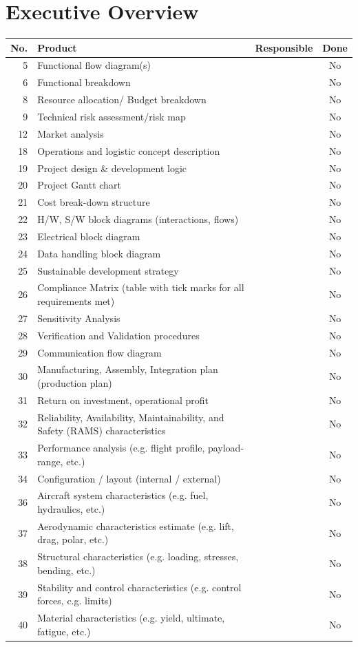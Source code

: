 \chapter{Executive Overview} \label{ch:executvesum}


\begin{tabularx}{\textwidth}{r X l c}
\toprule
\textbf{No.} & \textbf{Product} & \textbf{Responsible} & \textbf{Done} \\
\midrule
5 & Functional flow diagram(s) & & No \\
6 & Functional breakdown & & No \\
8 & Resource allocation/ Budget breakdown & & No \\
9 & Technical risk assessment/risk map & & No \\
12 & Market analysis & & No \\
18 & Operations and logistic concept description & & No \\
19 & Project design \& development logic & & No \\
20 & Project Gantt chart & & No \\
21 & Cost break-down structure & & No \\
22 & H/W, S/W block diagrams (interactions, flows) & & No \\
23 & Electrical block diagram & & No \\
24 & Data handling block diagram & & No \\
25 & Sustainable development strategy & & No \\
26 & Compliance Matrix (table with tick marks for all requirements met) & & No \\
27 & Sensitivity Analysis & & No \\
28 & Verification and Validation procedures & & No \\
29 & Communication flow diagram & & No \\
30 & Manufacturing, Assembly, Integration plan (production plan) & & No \\
31 & Return on investment, operational profit & & No \\
32 & Reliability, Availability, Maintainability, and Safety (RAMS) characteristics & & No \\
33 & Performance analysis (e.g. flight profile, payload-range, etc.) & & No \\
34 & Configuration / layout (internal / external) & & No \\
36 & Aircraft system characteristics (e.g. fuel, hydraulics, etc.) & & No \\
37 & Aerodynamic characteristics estimate (e.g. lift, drag, polar, etc.) & & No \\
38 & Structural characteristics (e.g. loading, stresses, bending, etc.) & & No \\
39 & Stability and control characteristics (e.g. control forces, c.g. limits) & & No \\
40 & Material characteristics (e.g. yield, ultimate, fatigue, etc.) & & No \\
\bottomrule
\end{tabularx}